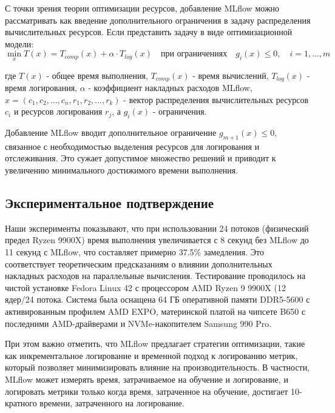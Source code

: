 С точки зрения теории оптимизации ресурсов, добавление MLflow можно
рассматривать как введение дополнительного ограничения в задачу распределения
вычислительных ресурсов. Если представить задачу в виде оптимизационной модели:
$$
	\min_{x} T(x) = T_{comp}(x) + \alpha \cdot T_{log}(x) \quad \text{при ограничениях} \quad g_i(x) \leq 0, \quad i = 1, \ldots, m
$$

где $T(x)$ - общее время выполнения, $T_{comp}(x)$ - время вычислений, $T_{log}(x)$ - время логирования, $\alpha$ - коэффициент накладных расходов MLflow, $x = (c_1, c_2, ..., c_n, r_1, r_2, ..., r_k)$ - вектор распределения вычислительных ресурсов $c_i$ и ресурсов логирования $r_j$, а $g_i(x)$ - ограничения.

Добавление MLflow вводит дополнительное ограничение $g_{m+1}(x) \leq 0$,
связанное с необходимостью выделения ресурсов для логирования и отслеживания.
Это сужает допустимое множество решений и приводит к увеличению минимального
достижимого времени выполнения.

\subsection{Экспериментальное подтверждение}

Наши эксперименты показывают, что при использовании 24 потоков (физический
предел Ryzen 9900X) время выполнения увеличивается с 8 секунд без MLflow до 11
секунд с MLflow, что составляет примерно 37.5\% замедления. Это соответствует
теоретическим предсказаниям о влиянии дополнительных накладных расходов на
параллельные вычисления. Тестирование проводилось на чистой установке Fedora Linux 42 с процессором AMD Ryzen 9 9900X (12 ядер/24 потока. Система была оснащена 64 ГБ оперативной памяти DDR5-5600 с активированным профилем AMD EXPO, материнской платой на чипсете B650 с последними AMD-драйверами и NVMe-накопителем Samsung 990 Pro.

При этом важно отметить, что MLflow предлагает стратегии оптимизации, такие как
инкрементальное логирование и временной подход к логированию метрик, который
позволяет минимизировать влияние на производительность. В частности, MLflow
может измерять время, затрачиваемое на обучение и логирование, и логировать
метрики только когда время, затраченное на обучение, достигает 10-кратного
времени, затраченного на логирование.

